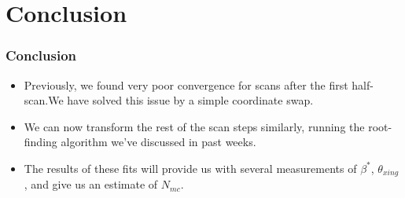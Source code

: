 \section{Conclusion}
\label{sec:conclusion}
\begin{frame}
  \frametitle{Conclusion}
  \begin{itemize}
    \item Previously, we found very poor convergence for scans after the first
      half-scan.We have solved this issue by a simple coordinate swap.

    \item We can now transform the rest of the scan steps similarly, running the
      root-finding algorithm we've discussed in past weeks.

    \item The results of these fits will provide us with several measurements of
      $\beta^*$, $\theta_{xing}$, and give us an estimate of $N_{mc}$.
  \end{itemize}
\end{frame}
